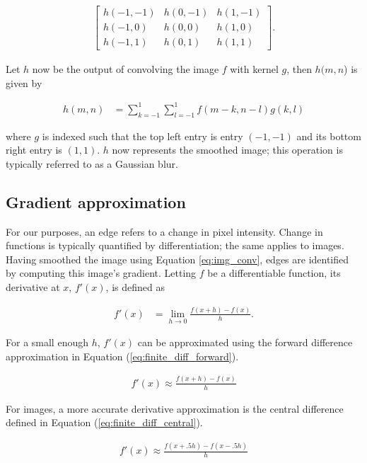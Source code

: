 \begin{align*}
\begin{bmatrix}
h(-1,-1) & h(0,-1) & h(1,-1) \\
h(-1,0) & h(0,0) & h(1,0) \\
h(-1, 1) & h(0, 1) & h(1,1)
\end{bmatrix}.
\end{align*}

Let $h$ now be the output of convolving the image $f$ with kernel $g$, then
$h(m,n$) is given by

\begin{align}\label{eq:img_conv}
h(m,n) &= \sum_{k=-1}^{1} \sum_{l=-1}^{1} f(m-k,n-l)g(k,l)
\end{align}

where $g$ is indexed such that the top left entry is entry $(-1,-1)$
and its bottom right entry is $(1,1)$. $h$ now represents the smoothed image;
this operation is typically referred to as a Gaussian blur. 

\subsection{Gradient approximation}
For our purposes, an edge refers to a change in pixel intensity. Change in 
functions is typically quantified by differentiation; the same applies to
images.
Having smoothed the image using Equation \ref{eq:img_conv}, edges are identified
by computing this image's gradient. Letting $f$ be a differentiable function,
its derivative at $x$, $f'(x)$, is defined as

\begin{align}\label{eq:derivative_def}
f'(x) &= \lim_{h \to 0} \frac{f(x+h) - f(x)}{h}.
\end{align}

For a small enough $h$, $f'(x)$ can be approximated using the forward 
difference approximation in Equation (\ref{eq:finite_diff_forward}).

\begin{align}\label{eq:finite_diff_forward}
f'(x) \approx \frac{f(x+h) - f(x)}{h}
\end{align}

For images, a more accurate derivative approximation is the central difference
defined in Equation (\ref{eq:finite_diff_central}).

\begin{align}\label{eq:finite_diff_central}
f'(x) \approx \frac{f(x+.5h) - f(x-.5h)}{h}
\end{align}

